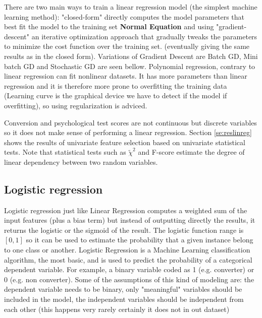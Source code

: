 \documentclass[11pt]{article}
\theoremstyle{definition}
\theoremstyle{remark}
\begin{document}
There are two main ways to train a linear regression model (the simplest machine learning method): "closed-form" directly computes the model parameters that best fit the model to the training set \textbf{Normal Equation} and using "gradient-descent" an iterative optimization approach that gradually tweaks the parameters to minimize the cost function over the training set. (eventually giving the same results as in the closed form). Variations of Gradient Descent are Batch GD, Mini batch GD and Stochastic GD are seen bellow.
Polynomial regression, contrary to linear regression can fit nonlinear datasets. It has more parameters than linear regression and it is therefore more prone to overfitting the training data (Learning curve is the graphical device we have to detect if the model if overfitting), so using regularization is adviced.

Conversion and psychological test scores are not continuous but discrete variables so it does not make sense of performing a linear regression. Section \ref{se:reslinreg} shows the results of univariate feature selection based on univariate statistical tests. Note that statistical tests such as $\tilde{\chi}^2$ and F-score estimate the degree of linear dependency between two random variables.


\subsection{Logistic regression}
\label{sse:logreg}

Logistic regression just like Linear Regression computes a weighted sum of the input features (plus a bias term) but instead of outputting directly the results, it returns the logistic or the sigmoid of the result. The logistic function range is $[0,1]$ so it can be used to estimate the probability that a given instance belong to one class or another. 
Logistic Regression is a Machine Learning classification algorithm, the most basic, and is used to predict the probability of a categorical dependent variable. For example, a binary variable coded as 1 (e.g. converter) or 0 (e.g. non converter). 
Some of the assumptions of this kind of modeling are: the dependent variable needs to be binary, only "meaningful" variables should be included in the model, the independent variables should be independent from each other (this happens very rarely certainly it does not in out dataset) 
\end{document}
